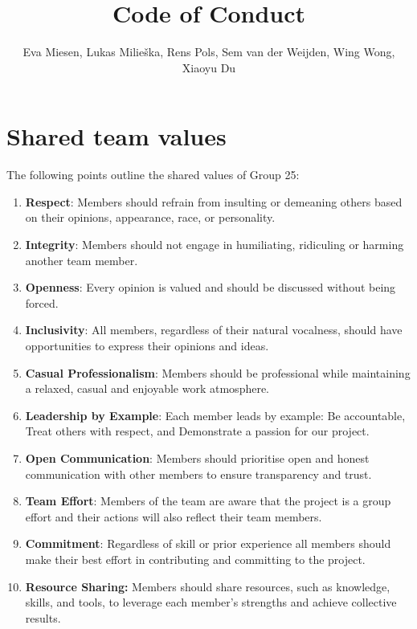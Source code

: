 \documentclass[sigconf,nonacm]{acmart}
\title{Code of Conduct}
\author{Eva Miesen, Lukas Milieška, Rens Pols, Sem van der Weijden, Wing Wong, Xiaoyu Du}
\begin{document}
\maketitle

\tableofcontents


\section{Shared team values}
The following points outline the shared values of Group 25:

\begin{enumerate}
    \item \textbf{Respect}: Members should refrain from insulting or demeaning others based on their opinions, appearance, race, or personality.
    \item \textbf{Integrity}: Members should not engage in humiliating, ridiculing or harming another team member.
    \item \textbf{Openness}: Every opinion is valued and should be discussed without being forced.
    \item \textbf{Inclusivity}: All members, regardless of their natural vocalness, should have opportunities to express their opinions and ideas.
    \item \textbf{Casual Professionalism}: Members should be professional while maintaining a relaxed, casual and enjoyable work atmosphere.
    \item \textbf{Leadership by Example}: Each member leads by example: Be accountable, Treat others with respect, and Demonstrate a passion for our project.
    \item \textbf{Open Communication}: Members should prioritise open and honest communication with other members to ensure transparency and trust.
    \item \textbf{Team Effort}: Members of the team are aware that the project is a group effort and their actions will also reflect their team members.
    \item \textbf{Commitment}: Regardless of skill or prior experience all members should make their best effort in contributing and committing to the project.
    \item \textbf{Resource Sharing:} Members should share resources, such as knowledge, skills, and tools, to leverage each member's strengths and achieve collective results.
\end{enumerate}
\end{document}
